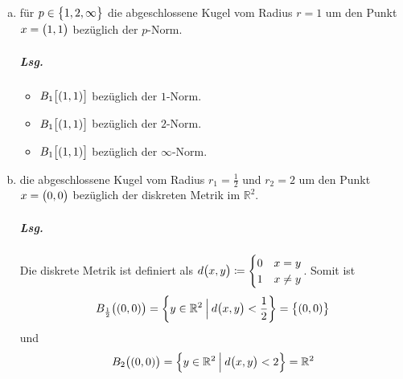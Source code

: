 \documentclass{scrreprt}
\begin{document}
\begin{enumerate}[(a)]
\item für $p \in \qty\big{1, 2, \infty}$ die abgeschlossene Kugel vom Radius
  $r = 1$ um den Punkt $x = \qty\big(1, 1)$ bezüglich der $p$-Norm.

  \subparagraph{Lsg.}
  \begin{itemize}
  \item {\color{black!30!orange} $B_1\qty\big[(1, 1)]$ bezüglich der $1$-Norm.}
  \item {\color{black!30!green} $B_1\qty\big[(1, 1)]$ bezüglich der $2$-Norm.}
  \item {\color{black!30!blue!80} $B_1\qty\big[(1, 1)]$ bezüglich der $\infty$-Norm.}
  \end{itemize}

\item die abgeschlossene Kugel vom Radius $r_1 = \frac{1}{2}$ und $r_2 = 2$
  um den Punkt $x = \qty\big(0, 0)$ bezüglich der diskreten Metrik im
  $\mathbb{R}^2$.

  \subparagraph{Lsg.} Die diskrete Metrik ist definiert als
  $d\qty\big(x, y) \coloneqq \begin{cases}
    0 & x = y \\
    1 & x \ne y
  \end{cases}$.
  Somit ist
  \[
    B_{\frac{1}{2}}\qty\big((0, 0))
    = \qty{y \in \mathbb{R}^2 \: {\Big |} \: d\qty\big(x, y) < \frac{1}{2}}
    = \qty\big{\qty(0, 0)}
  \]
  und
  \[
    B_2\qty\big((0, 0))
    = \qty{y \in \mathbb{R}^2 \: {\Big |} \: d\qty\big(x, y) < 2}
    = \mathbb{R}^2
  \]
\end{enumerate}

\newpage
\end{document}
